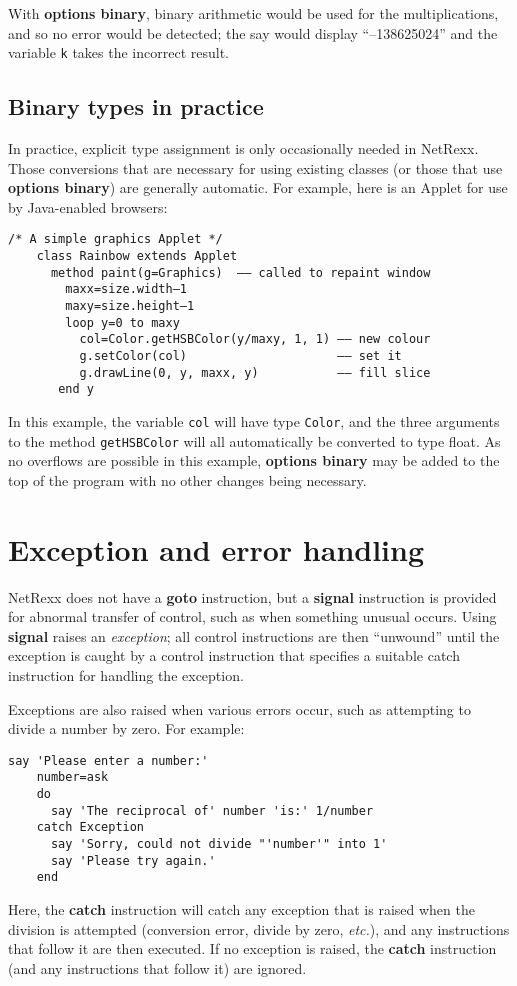 With \textbf{options binary}, binary arithmetic would be used for the multiplications, and so no error would be detected; the say would display “–138625024” and the variable \texttt{k} takes the incorrect result.
\subsection{Binary types in practice}
In practice, explicit type assignment is only occasionally needed in
NetRexx. Those conversions that are necessary for using existing
classes (or those that use \textbf{options binary}) are generally
automatic. For example, here is an Applet for use by Java-enabled
browsers:
\begin{lstlisting}[label=asimpleapplet,caption=A Simple Applet]
    /* A simple graphics Applet */
    class Rainbow extends Applet
      method paint(g=Graphics)  –– called to repaint window
        maxx=size.width–1
        maxy=size.height–1
        loop y=0 to maxy
          col=Color.getHSBColor(y/maxy, 1, 1) –– new colour
          g.setColor(col)                     –– set it
          g.drawLine(0, y, maxx, y)           –– fill slice
       end y
\end{lstlisting}
In this example, the variable \texttt{col} will have type \texttt{Color}, and the three
arguments to the method \texttt{getHSBColor} will all automatically be
converted to type float. As no overflows are possible in this example,
\textbf{options binary} may be added to the top of the program with no other
changes being necessary.

\section{Exception and error handling}\label{exceptions}
NetRexx does not have a \textbf{goto} instruction, but a \textbf{signal} instruction is provided for abnormal transfer of control, such as when something unusual occurs. Using \textbf{signal} raises an \emph{exception}; all control instructions are then “unwound” until the exception is caught by a control instruction that specifies a suitable catch instruction for handling the exception.

Exceptions are also raised when various errors occur, such as
attempting to divide a number by zero. For example:
\begin{lstlisting}[label=exception,caption=Exception]
    say 'Please enter a number:'
    number=ask
    do
      say 'The reciprocal of' number 'is:' 1/number
    catch Exception
      say 'Sorry, could not divide "'number'" into 1'
      say 'Please try again.'
    end
\end{lstlisting}
Here, the \textbf{catch} instruction will catch any exception that is raised when the division is attempted (conversion error, divide by zero, \emph{etc.}), and any instructions that follow it are then executed. If no exception is raised, the \textbf{catch} instruction (and any instructions that follow it) are ignored.

